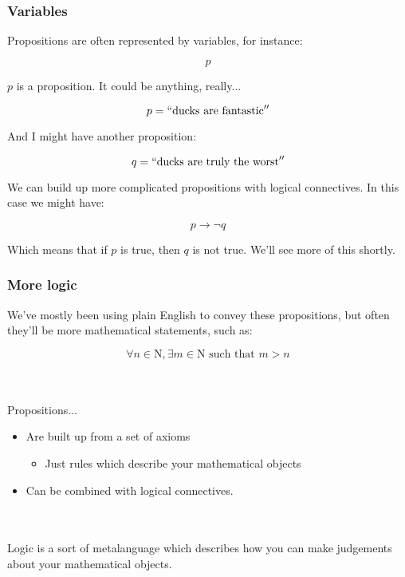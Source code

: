 \documentclass{beamer}
\begin{document}
\begin{frame}
  \frametitle{Variables}

  Propositions are often represented by variables, for instance:

  \[
    p
  \]

  \pause
  $p$ is a proposition. It could be anything, really...

  \pause
  \[
    p = ``\text{ducks are fantastic}''
  \]

  \pause
  And I might have another proposition:

  \[
    q = ``\text{ducks are truly the worst}''
  \]

  \pause
  We can build up more complicated propositions with logical connectives. In this case we might have:

  \[
    p \rightarrow \neg q
  \]

  Which means that if $p$ is true, then $q$ is not true. We'll see more of this shortly.
\end{frame}

\begin{frame}
  \frametitle{More logic}

  We've mostly been using plain English to convey these propositions, but often they'll be more mathematical statements, such as:

  \[\forall n \in \mathrm{N}, \exists m \in \mathrm{N} \text{ such that } m > n\]

  \pause \\~\\

  Propositions...

  \begin{itemize}
  \item Are built up from a set of axioms
    \begin{itemize}
    \item Just rules which describe your mathematical objects
    \end{itemize}
  \pause
  \item Can be combined with logical connectives.
  \end{itemize}

  \pause \\~\\

  Logic is a sort of metalanguage which describes how you can make judgements about your mathematical objects.
\end{frame}
\end{document}
